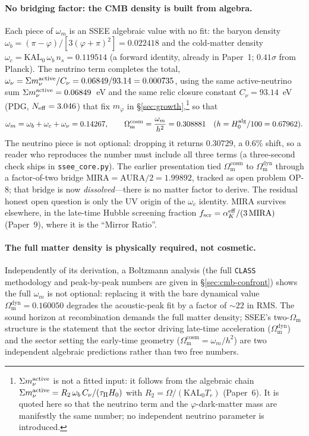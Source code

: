 \documentclass[aps,prd,preprint,amsmath,amssymb,nofootinbib,longbibliography]{revtex4-2}
\newcommand{\Om}{\Omega_{\mathrm{m}}}
\begin{document}
\paragraph{No bridging factor: the CMB density is built from algebra.} Each
piece of $\omega_m$ is an SSEE algebraic value with no fit: the baryon density
$\omega_b=(\pi-\varphi)/[3(\varphi+\pi)^2]=0.022418$ and the cold-matter density
$\omega_c=\mathrm{KAL_0}\,\omega_b\,n_s=0.119514$ (a forward identity, already in
Paper~1; $0.41\sigma$ from Planck). The neutrino term completes the total,
$\omega_\nu=\Sigma m_\nu^{\rm active}/C_\nu=0.06849/93.14=0.000735$, using the
same active-neutrino sum $\Sigma m_\nu^{\rm active}=0.06849$~eV and the same
relic closure constant $C_\nu=93.14$~eV (PDG, $N_{\rm eff}=3.046$) that fix
$m_\varphi$ in \S\ref{sec:growth},\footnote{$\Sigma m_\nu^{\rm active}$ is not
a fitted input: it follows from the algebraic chain
$\Sigma m_\nu^{\rm active}=R_2\,\omega_b\,C_\nu/(\tau_\Pi H_0)$ with
$R_2=\Omega/(\mathrm{KAL_0}T_r)$ (Paper~6). It is quoted here so that the
neutrino term and the $\varphi$-dark-matter mass are manifestly the same
number; no independent neutrino parameter is introduced.} so that
\begin{equation}
  \omega_m=\omega_b+\omega_c+\omega_\nu=0.14267,
  \qquad
  \Om^{\mathrm{cosm}}=\frac{\omega_m}{h^2}=0.308881
  \quad (h=H_0^{\rm alg}/100=0.67962).
  \label{eq:omcosm_breakdown}
\end{equation}
The neutrino piece is not optional: dropping it returns $0.30729$, a $0.6\%$
shift, so a reader who reproduces the number must include all three terms
(a three-second check ships in \texttt{ssee\_core.py}). The earlier presentation tied
$\Om^{\mathrm{cosm}}$ to $\Om^{\mathrm{dyn}}$ through a factor-of-two bridge
$\mathrm{MIRA}=\mathrm{AURA}/2=1.99892$, tracked as open problem OP-8; that
bridge is now \emph{dissolved}---there is no matter factor to derive. The
residual honest open question is only the UV origin of the $\omega_c$ identity.
$\mathrm{MIRA}$ survives elsewhere, in the late-time Hubble screening fraction
$f_{\rm scr}=\alpha_K^{\rm eff}/(3\,\mathrm{MIRA})$ (Paper~9), where it is the ``Mirror Ratio''.

\paragraph{The full matter density is physically required, not cosmetic.}
Independently of its derivation, a Boltzmann analysis (the full \texttt{CLASS}
methodology and peak-by-peak numbers are given in
\S\ref{sec:cmb-confront}) shows the full $\omega_m$ is not optional: replacing
it with the bare dynamical value $\Om^{\mathrm{dyn}}=0.160050$ degrades the
acoustic-peak fit by a factor of $\sim22$ in RMS. The sound horizon at
recombination demands the full matter density; SSEE's two-$\Om$ structure is
the statement that the sector driving late-time acceleration
($\Om^{\mathrm{dyn}}$) and the sector setting the early-time geometry
($\Om^{\mathrm{cosm}}=\omega_m/h^2$) are two independent algebraic
predictions rather than two free numbers.
\end{document}
